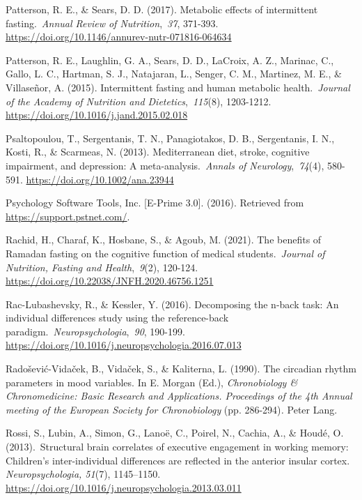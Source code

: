 \documentclass[authordate, empirical,issue]{jote-new-article}
\begin{document}
Patterson, R. E., \& Sears, D. D. (2017). Metabolic effects of intermittent fasting. \emph{Annual Review of Nutrition}, \emph{37}, 371-393. \url{https://doi.org/10.1146/annurev-nutr-071816-064634}



Patterson, R. E., Laughlin, G. A., Sears, D. D., LaCroix, A. Z., Marinac, C., Gallo, L. C., Hartman, S. J., Natajaran, L., Senger, C. M., Martinez, M. E., \& Villaseñor, A. (2015). Intermittent fasting and human metabolic health. \emph{Journal of the Academy of Nutrition and Dietetics}, \emph{115}(8), 1203-1212. \url{https://doi.org/10.1016/j.jand.2015.02.018}



Psaltopoulou, T., Sergentanis, T. N., Panagiotakos, D. B., Sergentanis, I. N., Kosti, R., \& Scarmeas, N. (2013). Mediterranean diet, stroke, cognitive impairment, and depression: A meta-analysis. \emph{Annals of Neurology}, \emph{74}(4), 580-591. \url{https://doi.org/10.1002/ana.23944}



Psychology Software Tools, Inc. [E-Prime 3.0]. (2016). Retrieved from \href{https://support.pstnet.com/?_ga=2.129355721.472427428.1688473658-755226607.1688473658&amp;_gl=1*px0hew*_ga*NzU1MjI2NjA3LjE2ODg0NzM2NTg.*_ga_8H8T10VXZT*MTY4ODQ3MzY1OC4xLjAuMTY4ODQ3MzY1OC42MC4wLjA.}{https://support.pstnet.com/}.



Rachid, H., Charaf, K., Hosbane, S., \& Agoub, M. (2021). The benefits of Ramadan fasting on the cognitive function of medical students. \emph{Journal of Nutrition, Fasting and Health}, \emph{9}(2), 120-124. \url{https://doi.org/10.22038/JNFH.2020.46756.1251}



Rac-Lubashevsky, R., \& Kessler, Y. (2016). Decomposing the n-back task: An individual differences study using the reference-back paradigm. \emph{Neuropsychologia}, \emph{90}, 190-199. \url{https://doi.org/10.1016/j.neuropsychologia.2016.07.013}



Radošević-Vidaček, B., Vidaček, S., \& Kaliterna, L. (1990). The circadian rhythm parameters in mood variables. In E. Morgan (Ed.), \emph{Chronobiology \& Chronomedicine: Basic Research and Applications. Proceedings of the 4th Annual meeting of the European Society for Chronobiology }(pp. 286-294)\emph{. }Peter Lang.



Rossi, S., Lubin, A., Simon, G., Lanoë, C., Poirel, N., Cachia, A., \& Houdé, O. (2013). Structural brain correlates of executive engagement in working memory: Children's inter-individual differences are reflected in the anterior insular cortex.\emph{ Neuropsychologia, 51}(7), 1145--1150. \url{https://doi.org/10.1016/j.neuropsychologia.2013.03.011}
\end{document}
